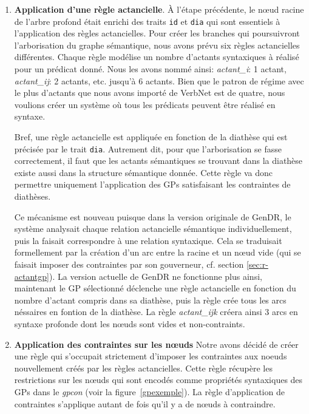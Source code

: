 \begin{enumerate}
	\item \textbf{Application d'une règle actancielle}.
	À l'étape précédente, le n\oe{}ud racine de l'arbre profond était enrichi des traits \texttt{id} et \texttt{dia} qui sont essentiels à l'application des règles actancielles. Pour créer les branches qui poursuivront l'arborisation du graphe sémantique, nous avons prévu six règles actancielles différentes. Chaque règle modélise un nombre d'actants syntaxiques à réalisé pour un prédicat donné. Nous les avons nommé ainsi: \emph{actant\_i}: 1 actant, \emph{actant\_ij}: 2 actants, etc. jusqu'à 6 actants. Bien que le patron de régime avec le plus d'actants que nous avons importé de VerbNet est de quatre, nous voulions créer un système où tous les prédicats peuvent être réalisé en syntaxe. 
	
	Bref, une règle actancielle est appliquée en fonction de la diathèse qui est précisée par le trait \texttt{dia}. Autrement dit, pour que l'arborisation se fasse correctement, il faut que les actants sémantiques se trouvant dans la diathèse existe aussi dans la structure sémantique donnée. Cette règle va donc permettre uniquement l'application des \acp{GP} satisfaisant les contraintes de diathèses.
	
	Ce mécanisme est nouveau puisque dans la version originale de GenDR, le système analysait chaque relation actancielle sémantique individuellement, puis la faisait correspondre à une relation syntaxique. Cela se traduisait formellement par la création d'un arc entre la racine et un n\oe{}ud vide (qui se faisait imposer des contraintes par son gouverneur, cf. section \ref{sec:r-actantgp}). La version actuelle de GenDR ne fonctionne plus ainsi, maintenant le \ac{GP} sélectionné déclenche une règle actancielle en fonction du nombre d'actant compris dans sa diathèse, puis la règle crée tous les arcs néssaires en fontion de la diathèse. La règle \emph{actant\_ijk} créera ainsi 3 arcs en syntaxe profonde dont les n\oe{}uds sont vides et non-contraints.
	
	\item \textbf{Application des contraintes sur les n\oe{}uds}
Notre avons décidé de créer une règle qui s'occupait strictement d'imposer les contraintes aux noeuds nouvellement créés par les règles actancielles. Cette règle récupère les restrictions sur les n\oe{}uds qui sont encodés comme propriétés syntaxiques des \acp{GP} dans le \emph{gpcon} (voir la figure~\ref{gpexemple}). La règle d'application de contraintes s'applique autant de fois qu'il y a de n\oe{}uds à contraindre.


\end{enumerate}
